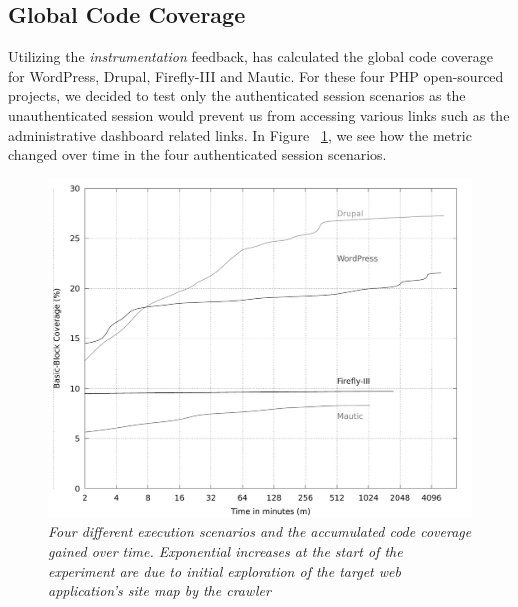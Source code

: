 \subsection{Global Code Coverage}
Utilizing the \emph{instrumentation} feedback, \pname{} has calculated the global code coverage for WordPress, Drupal, Firefly-III and Mautic. For these four PHP open-sourced projects, we decided to test only the authenticated session scenarios as the unauthenticated session would prevent us from  accessing various links such as the administrative dashboard related links. In Figure ~\ref{fig:plot_coverage}, we see how the metric changed over time in the four authenticated session scenarios.

\begin{figure}[!htb]
  \centering \includegraphics[width=\linewidth]{figures/plot_coverage.pdf}
  \captionsetup{justification=centering}
  \caption[Accumulated global code coverage using \pname{}]{\textit{Four different execution scenarios and the accumulated code coverage gained over time. Exponential increases at the start of the experiment are due to initial exploration of the target web application's site map by the crawler}} 
  \label{fig:plot_coverage}
\end{figure}

